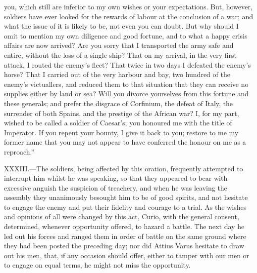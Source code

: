 you, which still are inferior to my own wishes or your expectations.
But, however, soldiers have ever looked for the rewards of labour at the
conclusion of a war; and what the issue of it is likely to be, not even
you can doubt. But why should I omit to mention my own diligence and
good fortune, and to what a happy crisis affairs are now arrived? Are
you sorry that I transported the army safe and entire, without the loss
of a single ship? That on my arrival, in the very first attack, I routed
the enemy's fleet? That twice in two days I defeated the enemy's horse?
That I carried out of the very harbour and bay, two hundred of the
enemy's victuallers, and reduced them to that situation that they can
receive no supplies either by land or sea? Will you divorce yourselves
from this fortune and these generals; and prefer the disgrace of
Corfinium, the defeat of Italy, the surrender of both Spains, and the
prestige of the African war? I, for my part, wished to be called a
soldier of Caesar's; you honoured me with the title of Imperator. If you
repent your bounty, I give it back to you; restore to me my former name
that you may not appear to have conferred the honour on me as a
reproach.''

XXXIII.—The soldiers, being affected by this oration, frequently
attempted to interrupt him whilst he was speaking, so that they appeared
to bear with excessive anguish the suspicion of treachery, and when he
was leaving the assembly they unanimously besought him to be of good
spirits, and not hesitate to engage the enemy and put their fidelity and
courage to a trial. As the wishes and opinions of all were changed by
this act, Curio, with the general consent, determined, whenever
opportunity offered, to hazard a battle. The next day he led out his
forces and ranged them in order of battle on the same ground where they
had been posted the preceding day; nor did Attius Varus hesitate to draw
out his men, that, if any occasion should offer, either to tamper with
our men or to engage on equal terms, he might not miss the opportunity.

